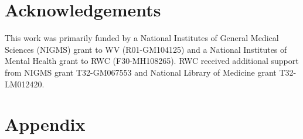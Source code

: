 \documentclass[9pt,twocolumn,twoside]{gsag3jnl}
\begin{document}

\section{Acknowledgements}
This work was primarily funded by a National Institutes of General Medical Sciences (NIGMS) grant to WV (R01-GM104125) and a National Institutes of Mental Health grant to RWC (F30-MH108265).
RWC received additional support from NIGMS grant T32-GM067553 and National Library of Medicine grant T32-LM012420.





\clearpage
\newpage
\section*{Appendix}

\setcounter{figure}{0}
\renewcommand{\thefigure}{A\arabic{figure}}
\end{document}

